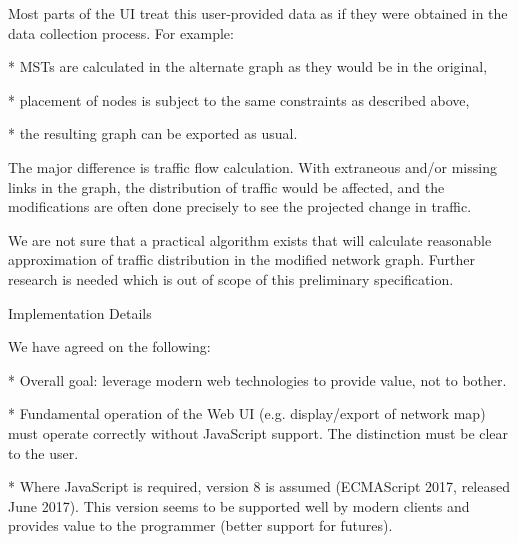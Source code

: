 Most parts of the UI treat this user-provided data as if they were obtained in
the data collection process. For example:

\begitems

* MSTs are calculated in the alternate graph as they would be in the original,

* placement of nodes is subject to the same constraints as described above,

* the resulting graph can be exported as usual.

\enditems

The major difference is traffic flow calculation. With extraneous and/or
missing links in the graph, the distribution of traffic would be affected, and
the modifications are often done precisely to see the projected change in
traffic.

We are not sure that a practical algorithm exists that will calculate reasonable
approximation of traffic distribution in the modified network graph. Further
research is needed which is out of scope of this preliminary specification.

\secc Implementation Details

We have agreed on the following:

\begitems

* Overall goal: leverage modern web technologies to provide value, not to bother.

* Fundamental operation of the Web UI (e.g. display/export of network map) must
operate correctly without JavaScript support. The distinction must be clear to
the user.

* Where JavaScript is required, version 8 is assumed (ECMAScript 2017, released
June 2017). This version seems to be supported well by modern clients and
provides value to the programmer (better support for futures).

\enditems

\bye
